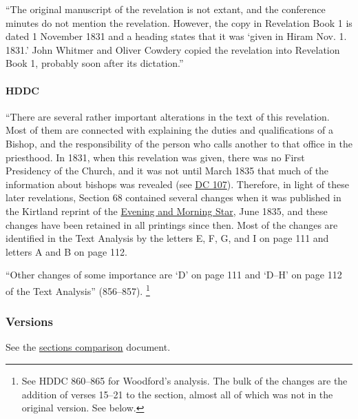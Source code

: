			``The original manuscript of the revelation is not extant, and the conference minutes do not mention the revelation. However, the copy in Revelation Book 1 is dated 1 November 1831 and a heading states that it was `given in Hiram Nov. 1. 1831.' John Whitmer and Oliver Cowdery copied the revelation into Revelation Book 1, probably soon after its dictation.''
			
		\paragraph{HDDC} 
		
			``There are several rather important alterations in the text of this revelation. Most of them are connected with explaining the duties and qualifications of a Bishop, and the responsibility of the person who calls another to that office in the priesthood. In 1831, when this revelation was given, there was no First Presidency of the Church, and it was not until March 1835 that much of the information about bishops was revealed (see \hyperref[DC107]{DC 107}). Therefore, in light of these later revelations, Section 68 contained several changes when it was published in the Kirtland reprint of the \uline{Evening and Morning Star}, June 1835, and these changes have been retained in all printings since then. Most of the changes are identified in the Text Analysis by the letters E, F, G, and I on page 111 and letters A and B on page 112.
			
			``Other changes of some importance are `D' on page 111 and `D--H' on page 112 of the Text Analysis'' (856--857).%
				\footnote{%
					See HDDC 860--865 for Woodford's analysis. The bulk of the changes are the addition of verses 15--21 to the section, almost all of which was not in the original version. See below.
					}
			
	\subsubsection{Versions}
		\label{DC68-V}
		
		See the \href{https://drive.google.com/file/d/1goAvNz8jS4R8slYfMG_db55Ty2z_vmgK/view?usp=sharing}{sections comparison} document.
	
